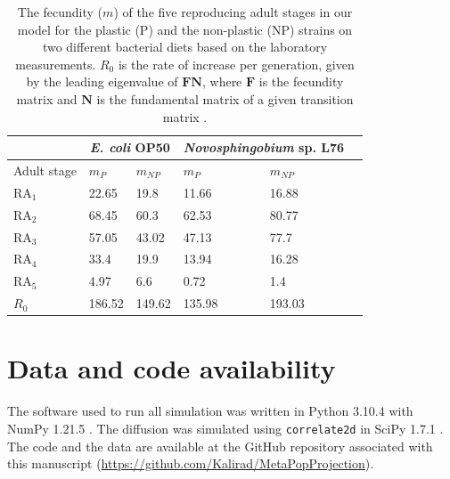\documentclass[10pt,letterpaper]{article}
\newcommand{\ecoli}{\emph{E. coli} OP50}
\newcommand{\novo}{\emph{Novosphingobium} sp. L76}
\begin{document}

\hspace{5cm}

\begin{table}[h!]
\centering
\begin{tabular}{|p{2cm}|p{1cm}|p{1cm}|p{1cm}|p{1cm}|p{1cm}|}
 \hline
& \multicolumn{2}{c}{\ecoli{}} & \multicolumn{2}{|c|}{\novo{}}\\
    \cline{1-2}
 \hline
Adult stage & $m_{P}$ & $m_{NP}$ & $m_{P}$ & $m_{NP}$ \\
 \hline
 RA$_1$ & 22.65 & 19.8 & 11.66 & 16.88 \\
 RA$_2$ & 68.45 & 60.3 & 62.53 & 80.77 \\
  RA$_3$ & 57.05 & 43.02 & 47.13 & 77.7 \\
   RA$_4$ & 33.4 & 19.9 & 13.94 & 16.28 \\
    RA$_5$ & 4.97 & 6.6 & 0.72 & 1.4 \\
    \hline 
    $R_0$ & 186.52 & 149.62 & 135.98 & 193.03 \\
 \hline
\end{tabular}
\caption{The fecundity ($m$) of the five reproducing adult stages in our model for the plastic (P) and the non-plastic (NP) strains on two different bacterial diets based on the laboratory measurements. $R_0$ is the rate of increase per generation, given by the leading eigenvalue of $\mathbf{F} \mathbf{N}$, where $\mathbf{F}$ is the fecundity matrix and $\mathbf{N}$ is the fundamental matrix of a given transition matrix \cite{Cushing1994}.}
\label{table:fec}
\end{table}


\section*{Data and code availability}

The software used to run all simulation was written in Python 3.10.4 with NumPy 1.21.5 \cite{har20i}. The diffusion was simulated using \texttt{correlate2d} in SciPy 1.7.1 \cite{2020SciPy-NMeth}. The code and the data are available at the GitHub repository associated with this manuscript (\url{https://github.com/Kalirad/MetaPopProjection}).


\end{document}

